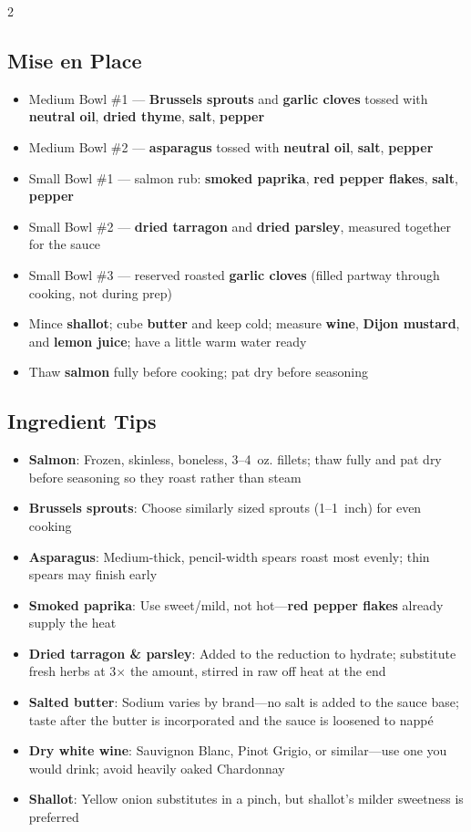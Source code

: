 \documentclass[11pt,letterpaper]{article}
\begin{document}
{\begin{multicols}{2}
\subsection*{Mise en Place}
\begin{itemize}
    \item Medium Bowl \#1 --- \textbf{Brussels sprouts} and \textbf{garlic cloves} tossed with \textbf{neutral oil}, \textbf{dried thyme}, \textbf{salt}, \textbf{pepper}
    \item Medium Bowl \#2 --- \textbf{asparagus} tossed with \textbf{neutral oil}, \textbf{salt}, \textbf{pepper}
    \item Small Bowl \#1 --- salmon rub: \textbf{smoked paprika}, \textbf{red pepper flakes}, \textbf{salt}, \textbf{pepper}
    \item Small Bowl \#2 --- \textbf{dried tarragon} and \textbf{dried parsley}, measured together for the sauce
    \item Small Bowl \#3 --- reserved roasted \textbf{garlic cloves} (filled partway through cooking, not during prep)
    \item Mince \textbf{shallot}; cube \textbf{butter} and keep cold; measure \textbf{wine}, \textbf{Dijon mustard}, and \textbf{lemon juice}; have a little warm water ready
    \item Thaw \textbf{salmon} fully before cooking; pat dry before seasoning
\end{itemize}

\subsection*{Ingredient Tips}
\begin{itemize}
    \item \textbf{Salmon}: Frozen, skinless, boneless, 3--4~oz. fillets; thaw fully and pat dry before seasoning so they roast rather than steam
    \item \textbf{Brussels sprouts}: Choose similarly sized sprouts (1--1~inch) for even cooking
    \item \textbf{Asparagus}: Medium-thick, pencil-width spears roast most evenly; thin spears may finish early
    \item \textbf{Smoked paprika}: Use sweet/mild, not hot---\textbf{red pepper flakes} already supply the heat
    \item \textbf{Dried tarragon \& parsley}: Added to the reduction to hydrate; substitute fresh herbs at 3$\times$ the amount, stirred in raw off heat at the end
    \item \textbf{Salted butter}: Sodium varies by brand---no salt is added to the sauce base; taste after the butter is incorporated and the sauce is loosened to napp\'{e}
    \item \textbf{Dry white wine}: Sauvignon Blanc, Pinot Grigio, or similar---use one you would drink; avoid heavily oaked Chardonnay
    \item \textbf{Shallot}: Yellow onion substitutes in a pinch, but shallot's milder sweetness is preferred
\end{itemize}


\end{multicols}}
\end{document}
